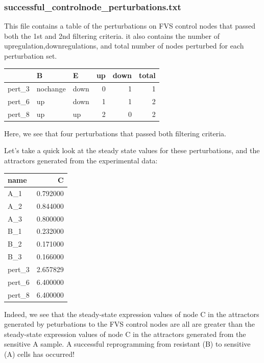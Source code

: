 \documentclass[
]{book}
\begin{document}
\hypertarget{section-id}{%
\subsubsection*{successful\_controlnode\_perturbations.txt}\label{section-id}}

This file contains a table of the perturbations on FVS control nodes that passed both the 1st and 2nd filtering criteria. it also contains the number of upregulation,downregulations, and total number of nodes perturbed for each perturbation set.

\begin{tabular}{l|l|l|r|r|r}
\hline
  & B & E & up & down & total\\
\hline
pert\_3 & nochange & down & 0 & 1 & 1\\
\hline
pert\_6 & up & down & 1 & 1 & 2\\
\hline
pert\_8 & up & up & 2 & 0 & 2\\
\hline
\end{tabular}

Here, we see that four perturbations that passed both filtering criteria.

Let's take a quick look at the steady state values for these perturbations, and the attractors generated from the experimental data:

\begin{tabular}{l|r}
\hline
name & C\\
\hline
A\_1 & 0.792000\\
\hline
A\_2 & 0.844000\\
\hline
A\_3 & 0.800000\\
\hline
B\_1 & 0.232000\\
\hline
B\_2 & 0.171000\\
\hline
B\_3 & 0.166000\\
\hline
pert\_3 & 2.657829\\
\hline
pert\_6 & 6.400000\\
\hline
pert\_8 & 6.400000\\
\hline
\end{tabular}

Indeed, we see that the steady-state expression values of node C in the attractors generated by peturbations to the FVS control nodes are all are greater than the steady-state expression values of node C in the attractors generated from the sensitive A sample. A successful reprogramming from resistant (B) to sensitive (A) cells has occurred!
\end{document}
